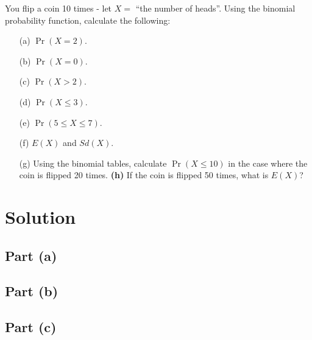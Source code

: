 \documentclass[a4paper,12pt]{article}
\begin{document}
\large 


You flip a coin 10 times - let $X =$ ``the number of heads''. Using the binomial probability function, calculate the following:\\[-0.2cm]
\begin{itemize}
\item[(a)] $\Pr(X = 2)$.  \item[(b)] $\Pr(X = 0)$.  \item[(c)]  $\Pr(X > 2)$.  \item[(d)] $\Pr(X \le 3)$.  \item[(e)] $\Pr(5 \le X \le 7)$.   \item[(f)] $E(X)$ and $Sd(X)$.  \item[(g)] Using the binomial tables, calculate $\Pr(X \le10)$ in the case where the coin is flipped 20 times.  {\bf(h)} If the coin is flipped 50 times, what is $E(X)$?
\end{itemize}


\section*{Solution}

\subsection*{Part (a)}

\subsection*{Part (b)}

\subsection*{Part (c)}	
\end{document}
